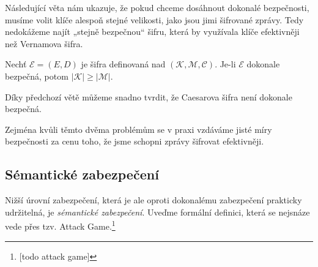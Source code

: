 \documentclass[
  program=infoi,
  biblatex,
  figures=false,
  glossaries,
  index
]{kidiplom}
\begin{document}
        Následující věta nám ukazuje, že pokud chceme dosáhnout dokonalé bezpečnosti, musíme volit klíče alespoň stejné
        velikosti, jako jsou jimi šifrované zprávy. Tedy nedokážeme najít „stejně bezpečnou“ šifru, která by
        využívala klíče efektivněji než Vernamova šifra.

        \begin{theorem}
            
            Nechť $\mathcal{E}  = (E, D)$ je šifra definovaná nad $(\mathcal{K},\mathcal{M},\mathcal{C})$.
            Je-li $\mathcal{E}$ dokonale bezpečná, potom $|\mathcal{K}| \geq |\mathcal{M}|$.
        \end{theorem}


        \medskip

        Díky předchozí větě můžeme snadno tvrdit, že Caesarova šifra není dokonale bezpečná.

        Zejména kvůli těmto dvěma problémům se v praxi vzdáváme jisté míry bezpečnosti za cenu toho, že jsme schopni zprávy šifrovat efektivněji.


    \subsection{Sémantické zabezpečení}\label{sub:semantic-security-private}

        Nižší úrovní zabezpečení, která je ale oproti dokonalému zabezpečení prakticky udržitelná, je \emph{sémantické zabezpečení}.        
        Uveďme formální definici, která se nejsnáze vede přes tzv. Attack Game.\footnote{[todo attack game]}
\end{document}
